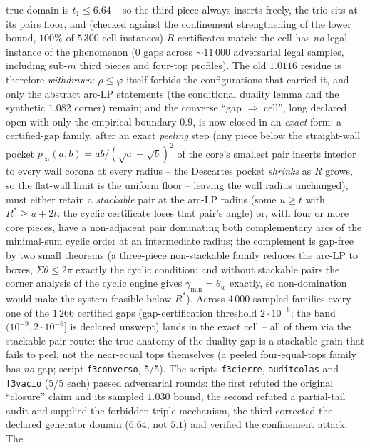 \documentclass[11pt]{article}
\theoremstyle{definition}
\begin{document}
true domain is $t_1\le6.64$ -- so the third piece always inserts
freely, the trio sits at its pairs floor, and (checked against the
confinement strengthening of the lower bound, $100\%$ of $5\,300$
cell instances) $R$ certificates match: the cell has \emph{no}
legal instance of the phenomenon ($0$ gaps across $\sim11\,000$
adversarial legal samples, including sub-$m$ third pieces and
four-top profiles). The old $1.0116$ residue is therefore
\emph{withdrawn}: $\rho\le\varphi$ itself forbids the
configurations that carried it, and only the abstract arc-LP
statements (the conditional duality lemma and the synthetic
$1.082$ corner) remain; and the converse ``gap $\Rightarrow$
cell'', long declared open with only the empirical boundary
$0.9$, is now closed in an \emph{exact} form: a certified-gap
family, after an exact \emph{peeling} step (any piece below the
straight-wall pocket $p_\infty(a,b)=ab/(\sqrt a+\sqrt b)^2$ of
the core's smallest pair inserts interior to every wall corona
at every radius -- the Descartes pocket \emph{shrinks} as $R$
grows, so the flat-wall limit is the uniform floor -- leaving
the wall radius unchanged), must either retain a
\emph{stackable} pair at the arc-LP radius (some $u\ge t$ with
$R^{*}\ge u+2t$: the cyclic certificate loses that pair's angle)
or, with four or more core pieces, have a non-adjacent pair
dominating both complementary arcs of the minimal-sum cyclic
order at an intermediate radius; the complement is gap-free by
two small theorems (a three-piece non-stackable family reduces
the arc-LP to boxes, $\Sigma\theta\le2\pi$ exactly the cyclic
condition; and without stackable pairs the corner analysis of
the cyclic engine gives $\gamma_{\min}=\theta_w$ exactly, so
non-domination would make the system feasible below $R^{*}$).
Across $4\,000$ sampled families every one of the $1\,266$
certified gaps (gap-certification threshold $2\cdot10^{-6}$; the
band $(10^{-9},2\cdot10^{-6}]$ is declared unswept) lands in the
exact cell -- all of them via the
stackable-pair route: the true anatomy of the duality gap is a
stackable grain that fails to peel, not the near-equal tops
themselves (a peeled four-equal-tops family has \emph{no} gap;
script \texttt{f3converso}, 5/5).
The scripts
\texttt{f3cierre}, \texttt{auditcolas} and \texttt{f3vacio} (5/5
each) passed adversarial rounds: the first refuted the original
``closure'' claim and its sampled $1.030$ bound, the second
refuted a partial-tail audit and supplied the forbidden-triple
mechanism, the third corrected the declared generator domain
($6.64$, not $5.1$) and verified the confinement attack. The
\end{document}
